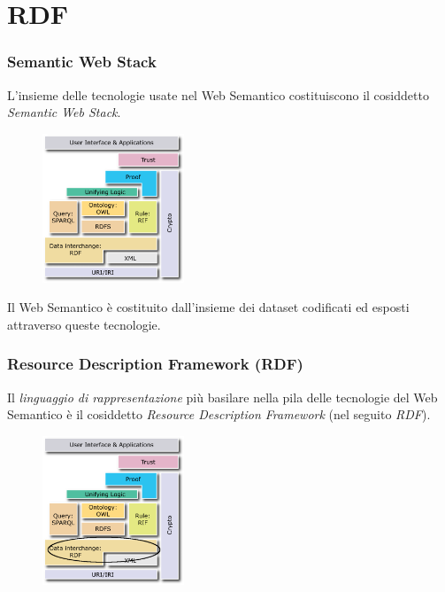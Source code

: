 \documentclass[8pt]{beamer}
\begin{document}
\section{RDF}

\begin{frame}
 \frametitle{Semantic Web Stack}
 
 L'insieme delle tecnologie usate nel Web Semantico costituiscono il 
 cosiddetto \emph{Semantic Web Stack}.
 
 \begin{figure}
   \includegraphics[width=160px]{Semantic_Web_Stack.png} 
 \end{figure}

 Il Web Semantico \`e costituito dall'insieme dei dataset 
 codificati ed esposti attraverso queste tecnologie.
\end{frame}

\begin{frame}
 \frametitle{Resource Description Framework (RDF)}
 Il \emph{linguaggio di rappresentazione} pi\`u basilare nella pila
 delle tecnologie del Web Semantico \`e il cosiddetto 
 \emph{Resource Description Framework} (nel seguito \emph{RDF}).
 
  \begin{figure}
  \includegraphics[width=160px]{Semantic_Web_Stack_RDF.png}
 \end{figure}
\end{frame}

\newcommand{\RDFv}{\mathtt{RDF}}
\end{document}
